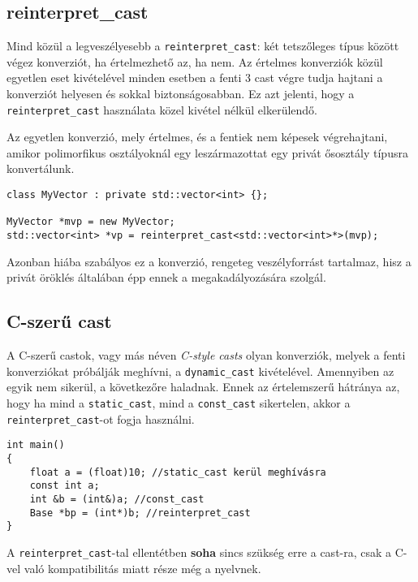 \documentclass[a4paper,11.5pt,table]{article}
\begin{document}
	\subsection{reinterpret\_cast}
	Mind közül a legveszélyesebb a \texttt{reinterpret\_cast}: két tetszőleges típus között végez konverziót, ha értelmezhető az, ha nem. Az értelmes konverziók közül egyetlen eset kivételével minden esetben a fenti 3 cast végre tudja hajtani a konverziót helyesen és sokkal biztonságosabban. Ez azt jelenti, hogy a \texttt{reinterpret\_cast} használata közel kivétel nélkül elkerülendő.
	
	\smallskip
	Az egyetlen konverzió, mely értelmes, és a fentiek nem képesek végrehajtani, amikor polimorfikus osztályoknál egy leszármazottat egy privát ősosztály típusra konvertálunk.
	\begin{lstlisting}
class MyVector : private std::vector<int> {};

MyVector *mvp = new MyVector;
std::vector<int> *vp = reinterpret_cast<std::vector<int>*>(mvp);
	\end{lstlisting}
	Azonban hiába szabályos ez a konverzió, rengeteg veszélyforrást tartalmaz, hisz a privát öröklés általában épp ennek a megakadályozására szolgál.
	\subsection{C-szerű cast}
	A C-szerű castok, vagy más néven \textit{C-style casts} olyan konverziók, melyek a fenti konverziókat próbálják meghívni, a \texttt{dynamic\_cast} kivételével. Amennyiben az egyik nem sikerül, a következőre haladnak. Ennek az értelemszerű hátránya az, hogy ha mind a \texttt{static\_cast}, mind a \texttt{const\_cast} sikertelen, akkor a \texttt{reinterpret\_cast}-ot fogja használni.
	\begin{lstlisting}
int main()
{
	float a = (float)10; //static_cast kerül meghívásra
	const int a;
	int &b = (int&)a; //const_cast
	Base *bp = (int*)b; //reinterpret_cast 
}
	\end{lstlisting}
	A \texttt{reinterpret\_cast}-tal ellentétben \textbf{soha} sincs szükség erre a cast-ra, csak a C-vel való kompatibilitás miatt része még a nyelvnek.
\end{document}
